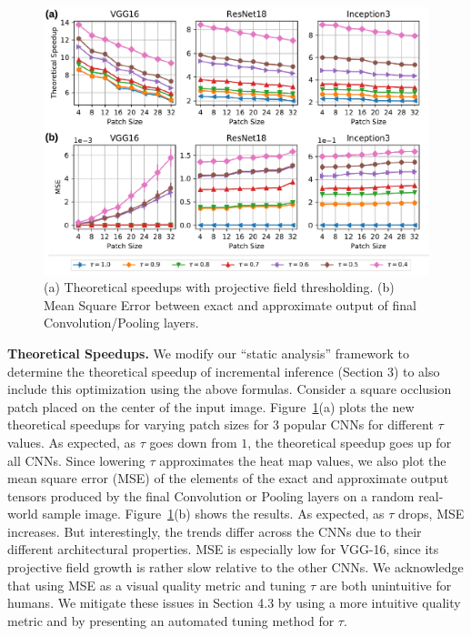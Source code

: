 \begin{figure}[t]
\includegraphics[width=\columnwidth]{images/proj_thresholding}
\vspace{-6mm}
\caption{(a) Theoretical speedups with projective field thresholding. (b) Mean Square Error between exact and approximate output of final Convolution/Pooling layers.}
\label{fig:proj_thresholding}
\end{figure}

\vspace{2mm}
\noindent \textbf{Theoretical Speedups.}
We modify our ``static analysis'' framework to determine the theoretical speedup of incremental inference (Section 3) to also include this optimization using the above formulas. Consider a square occlusion patch placed on the center of the input image. Figure~\ref{fig:proj_thresholding}(a) plots the new theoretical speedups for varying patch sizes for 3 popular CNNs for different $\tau$ values.
As expected, as $\tau$ goes down from $1$, the theoretical speedup goes up for all CNNs. Since lowering $\tau$ approximates the heat map values, we also plot the mean square error (MSE) of the elements of the exact and approximate output tensors produced by the final Convolution or Pooling layers on a random real-world sample image. Figure~\ref{fig:proj_thresholding}(b) shows the results. As expected, as $\tau$ drops, MSE increases. But interestingly, the trends differ across the CNNs due to their different architectural properties. MSE is especially low for VGG-16, since its projective field growth is rather slow relative to the other CNNs. We acknowledge that using MSE as a visual quality metric and tuning $\tau$ are both unintuitive for humans. We mitigate these issues in Section 4.3 by using a more intuitive quality metric and by presenting an automated tuning method for $\tau$.


